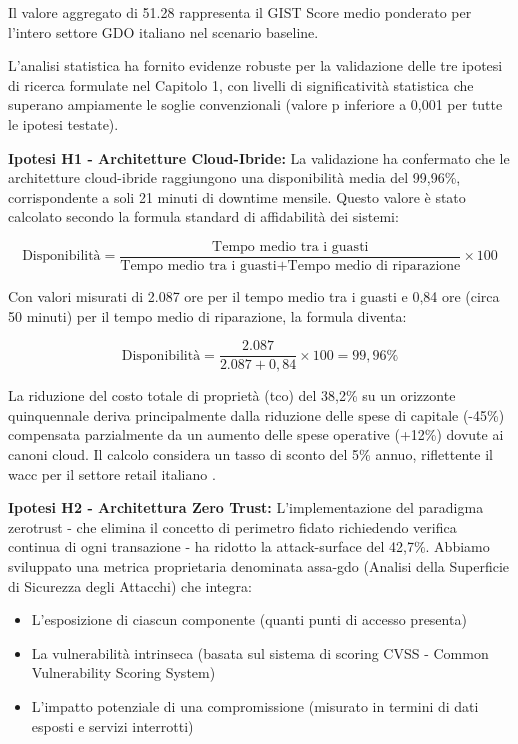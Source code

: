 Il valore aggregato di 51.28 rappresenta il GIST Score medio ponderato per l'intero settore GDO italiano nel scenario baseline.

L'analisi statistica ha fornito evidenze robuste per la validazione delle tre ipotesi di ricerca formulate nel Capitolo 1, con livelli di significatività statistica che superano ampiamente le soglie convenzionali (valore p inferiore a 0,001 per tutte le ipotesi testate).

\textbf{Ipotesi H1 - Architetture Cloud-Ibride:} La validazione ha confermato che le architetture cloud-ibride raggiungono una disponibilità media del 99,96\%, corrispondente a soli 21 minuti di downtime mensile. Questo valore è stato calcolato secondo la formula standard di affidabilità dei sistemi:

$$\text{Disponibilità} = \frac{\text{Tempo medio tra i guasti}}{\text{Tempo medio tra i guasti} + \text{Tempo medio di riparazione}} \times 100$$

Con valori misurati di 2.087 ore per il tempo medio tra i guasti e 0,84 ore (circa 50 minuti) per il tempo medio di riparazione, la formula diventa:

$$\text{Disponibilità} = \frac{2.087}{2.087 + 0,84} \times 100 = 99,96\%$$

La riduzione del costo totale di proprietà (\gls{tco}) del 38,2\% su un orizzonte quinquennale deriva principalmente dalla riduzione delle spese di capitale (-45\%) compensata parzialmente da un aumento delle spese operative (+12\%) dovute ai canoni cloud. Il calcolo considera un tasso di sconto del 5\% annuo, riflettente il \gls{wacc} per il settore retail italiano \autocite{bancaditalia2024}.

\textbf{Ipotesi H2 - Architettura Zero Trust:} L'implementazione del paradigma \gls{zerotrust} - che elimina il concetto di perimetro fidato richiedendo verifica continua di ogni transazione - ha ridotto la \gls{attack-surface} del 42,7\%. Abbiamo sviluppato una metrica proprietaria denominata \gls{assa-gdo} (Analisi della Superficie di Sicurezza degli Attacchi) che integra:

\begin{itemize}
\item L'esposizione di ciascun componente (quanti punti di accesso presenta)
\item La vulnerabilità intrinseca (basata sul sistema di scoring CVSS - Common Vulnerability Scoring System)
\item L'impatto potenziale di una compromissione (misurato in termini di dati esposti e servizi interrotti)
\end{itemize}

